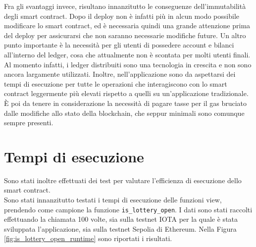 \documentclass[12pt,a4paper,openright,twoside]{report}
\begin{document}
Fra gli svantaggi invece, risultano innanzitutto le conseguenze dell'immutabilità degli smart contract. Dopo il deploy non è infatti più in alcun modo possibile modificare lo smart contract, ed è necessaria quindi una grande attenzione prima del deploy per assicurarsi che non saranno necessarie modifiche future. Un altro punto importante è la necessità per gli utenti di possedere account e bilanci all'interno del ledger, cosa che attualmente non è scontata per molti utenti finali. Al momento infatti, i ledger distribuiti sono una tecnologia in crescita e non sono ancora largamente utilizzati. Inoltre, nell'applicazione sono da aspettarsi dei tempi di esecuzione per tutte le operazioni che interagiscono con lo smart contract leggermente più elevati rispetto a quelli su un'applicazione tradizionale. È poi da tenere in considerazione la necessità di pagare tasse per il gas bruciato dalle modifiche allo stato della blockchain, che seppur minimali sono comunque sempre presenti. 

\section{Tempi di esecuzione}
Sono stati inoltre effettuati dei test per valutare l'efficienza di esecuzione dello smart contract.\\
Sono stati innanzitutto testati i tempi di esecuzione delle funzioni view, prendendo come campione la funzione \texttt{is\_lottery\_open}. I dati sono stati raccolti effettuando la chiamata 100 volte, sia sulla testnet IOTA per la quale è stata sviluppata l'applicazione, sia sulla testnet Sepolia di Ethereum. Nella Figura \ref{fig:is_lottery_open_runtime} sono riportati i risultati.
\end{document}
